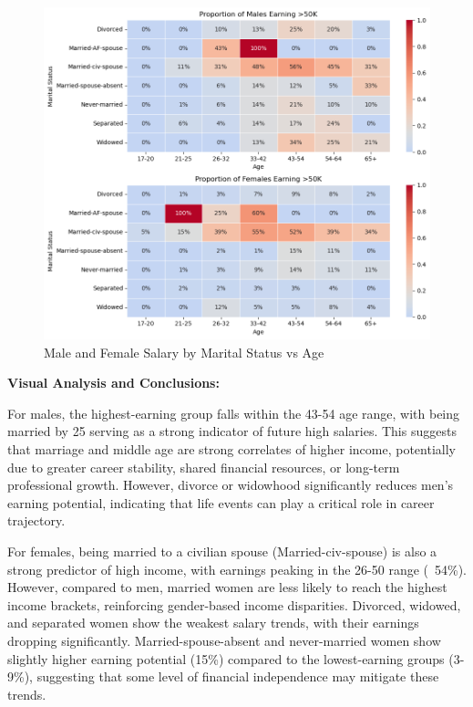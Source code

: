 \documentclass[journal,onecolumn]{IEEEtran}
\begin{document}
\begin{figure}[h]
    \centering
    \includegraphics[width=1\linewidth]{mf_marital_agebins.png}  %
    \caption{Male and Female Salary by Marital Status vs Age}
    \label{fig:mf_marital_agebins}
\end{figure}


\textbf{Visual Analysis and Conclusions:} 
\medskip
    

For males, the highest-earning group falls within the 43-54 age range, with being
married by 25 serving as a strong indicator of future high salaries. This suggests
that marriage and middle age are strong correlates of higher income, potentially
due to greater career stability, shared financial resources, or long-term professional
growth. However, divorce or widowhood significantly reduces men’s earning potential,
indicating that life events can play a critical role in career trajectory.

For females, being married to a civilian spouse (Married-civ-spouse) is also a
strong predictor of high income, with earnings peaking in the 26-50 range (~54\%).
However, compared to men, married women are less likely to reach the highest income
brackets, reinforcing gender-based income disparities. Divorced, widowed, and
separated women show the weakest salary trends, with their earnings dropping
significantly. Married-spouse-absent and never-married women show slightly
higher earning potential (15\%) compared to the lowest-earning groups (3-9\%),
suggesting that some level of financial independence may mitigate these trends.
\end{document}
